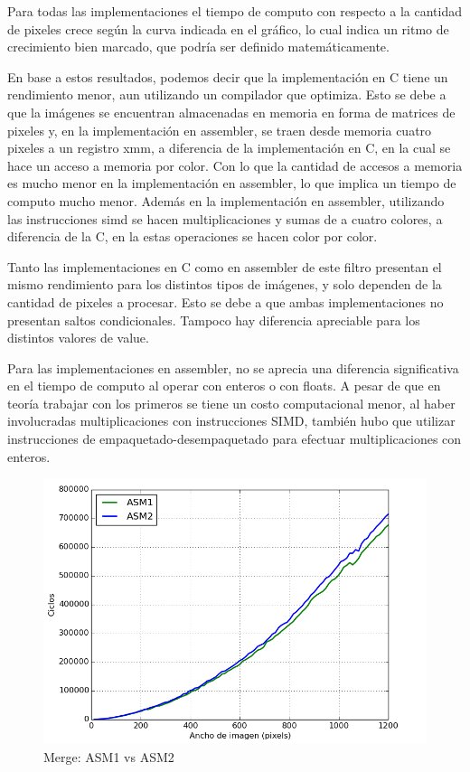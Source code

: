 \documentclass[a4paper]{article}
\begin{document}
Para todas las implementaciones el tiempo de computo con respecto a la cantidad de pixeles crece según la curva indicada en el gráfico, lo cual indica un ritmo de crecimiento bien marcado, que podría ser definido matemáticamente.


En base a estos resultados, podemos decir que la implementación en C tiene un rendimiento menor, aun utilizando un compilador que optimiza. Esto se debe a que la imágenes se encuentran almacenadas en memoria en forma de matrices de pixeles y, en la implementación en assembler, se traen desde memoria cuatro pixeles a un registro xmm, a diferencia de la implementación en C, en la cual se hace un acceso a memoria por color. Con lo que la cantidad de accesos a memoria es mucho menor en la implementación en assembler, lo que implica un tiempo de computo mucho menor. Además en la implementación en assembler, utilizando las instrucciones simd se hacen multiplicaciones y sumas de a cuatro colores, a diferencia de la C, en la estas operaciones se hacen color por color.

Tanto las implementaciones en C como en assembler de este filtro presentan el mismo rendimiento para los distintos tipos de imágenes, y solo dependen de la cantidad de pixeles a procesar. Esto se debe a que ambas implementaciones no presentan saltos condicionales. Tampoco hay diferencia apreciable para los distintos valores de value.

Para las implementaciones en assembler, no se aprecia una diferencia significativa en el tiempo de computo al operar con enteros o con floats. A pesar de que en teoría trabajar con los primeros se tiene un costo computacional menor, al haber involucradas multiplicaciones con instrucciones SIMD, también hubo que utilizar instrucciones de empaquetado-desempaquetado para efectuar multiplicaciones con enteros. 

\begin{figure}[H]
\centering
\includegraphics[scale=0.5]{imagenes/merge-asms.png}
\caption{Merge: ASM1 vs ASM2}
\label{lshValue}
\end{figure}
\end{document}
